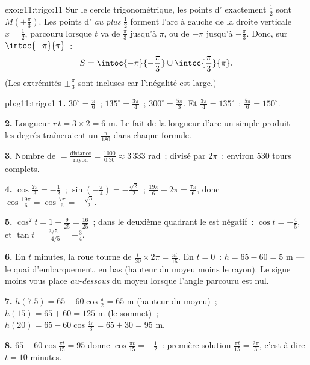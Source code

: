 \begin{solution}{exo:g11:trigo:11}
Sur le cercle trigonométrique, les points d' exactement
$\frac12$ sont $M\!\left(\pm\frac\pi3\right)$. Les points d'
\emph{au plus} $\frac12$ forment l'arc à gauche de la droite verticale
$x = \frac12$, parcouru lorsque $t$ va de $\frac\pi3$ jusqu'à $\pi$, ou
de $-\pi$ jusqu'à $-\frac\pi3$. Donc, sur $\intoc{-\pi}{\pi}$~:
\[
S = \intoc{-\pi}{-\frac{\pi}{3}} \cup \intcc{\frac{\pi}{3}}{\pi}.
\]
(Les extrémités $\pm\frac\pi3$ sont incluses car l'inégalité est large.)
\end{solution}

\begin{solution}{pb:g11:trigo:1}
\textbf{1.} $30^\circ = \frac{\pi}{6}$~; $135^\circ =
\frac{3\pi}{4}$~; $300^\circ = \frac{5\pi}{3}$. Et
$\frac{3\pi}{4} = 135^\circ$~; $\frac{5\pi}{6} = 150^\circ$.

\textbf{2.} Longueur $r\,t = 3 \times 2 = 6$ m. Le  fait de
la longueur d'arc un simple produit --- les degrés traîneraient un
$\frac{\pi}{180}$ dans chaque formule.

\textbf{3.} Nombre de  $= \frac{\text{distance}}
{\text{rayon}} = \frac{1000}{0.30} \approx 3\,333$ rad~; divisé par
$2\pi$~: environ $530$ tours complets.

\textbf{4.} $\cos\frac{2\pi}{3} = -\frac12$~;
$\sin\left(-\frac\pi4\right) = -\frac{\sqrt2}{2}$~;
$\frac{19\pi}{6} - 2\pi = \frac{7\pi}{6}$, donc
$\cos\frac{19\pi}{6} = \cos\frac{7\pi}{6} = -\frac{\sqrt3}{2}$.

\textbf{5.} $\cos^2 t = 1 - \frac{9}{25} = \frac{16}{25}$~; dans le
deuxième quadrant le  est négatif~: $\cos t = -\frac45$, et
$\tan t = \frac{3/5}{-4/5} = -\frac34$.

\textbf{6.} En $t$ minutes, la roue tourne de
$\frac{t}{30} \times 2\pi = \frac{\pi t}{15}$. En $t = 0$~:
$h = 65 - 60 = 5$ m --- le quai d'embarquement, en bas (hauteur du
moyeu moins le rayon). Le signe moins vous place \emph{au-dessous}
du moyeu lorsque l'angle parcouru est nul.

\textbf{7.} $h(7.5) = 65 - 60\cos\frac{\pi}{2} = 65$ m (hauteur du
moyeu)~; $h(15) = 65 + 60 = 125$ m (le sommet)~;
$h(20) = 65 - 60\cos\frac{4\pi}{3} = 65 + 30 = 95$ m.

\textbf{8.} $65 - 60\cos\frac{\pi t}{15} = 95$ donne
$\cos\frac{\pi t}{15} = -\frac12$~: première solution
$\frac{\pi t}{15} = \frac{2\pi}{3}$, c'est-à-dire $t = 10$
minutes.


\end{solution}
